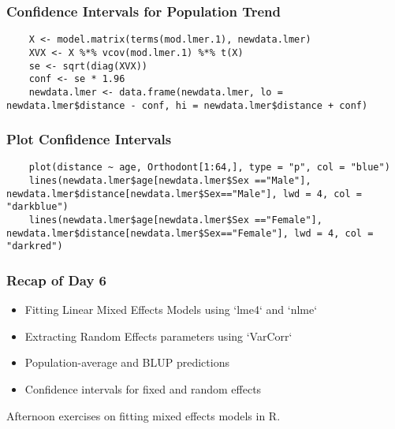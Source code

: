 \documentclass{beamer}
\begin{document}
\begin{frame}[fragile]
    \frametitle{Confidence Intervals for Population Trend}
    \lstset{style=Rstyle}
    \begin{lstlisting}
    X <- model.matrix(terms(mod.lmer.1), newdata.lmer)
    XVX <- X %*% vcov(mod.lmer.1) %*% t(X)
    se <- sqrt(diag(XVX))
    conf <- se * 1.96
    newdata.lmer <- data.frame(newdata.lmer, lo = newdata.lmer$distance - conf, hi = newdata.lmer$distance + conf)
    \end{lstlisting}
\end{frame}

\begin{frame}[fragile]
    \frametitle{Plot Confidence Intervals}
    \lstset{style=Rstyle}
    \begin{lstlisting}
    plot(distance ~ age, Orthodont[1:64,], type = "p", col = "blue")
    lines(newdata.lmer$age[newdata.lmer$Sex =="Male"], newdata.lmer$distance[newdata.lmer$Sex=="Male"], lwd = 4, col = "darkblue")
    lines(newdata.lmer$age[newdata.lmer$Sex =="Female"], newdata.lmer$distance[newdata.lmer$Sex=="Female"], lwd = 4, col = "darkred")
    \end{lstlisting}
\end{frame}

\begin{frame}
    \frametitle{Recap of Day 6}
    \begin{itemize}
        \item Fitting Linear Mixed Effects Models using `lme4` and `nlme`
        \item Extracting Random Effects parameters using `VarCorr`
        \item Population-average and BLUP predictions
        \item Confidence intervals for fixed and random effects
    \end{itemize}
    Afternoon exercises on fitting mixed effects models in R.
\end{frame}
\end{document}
